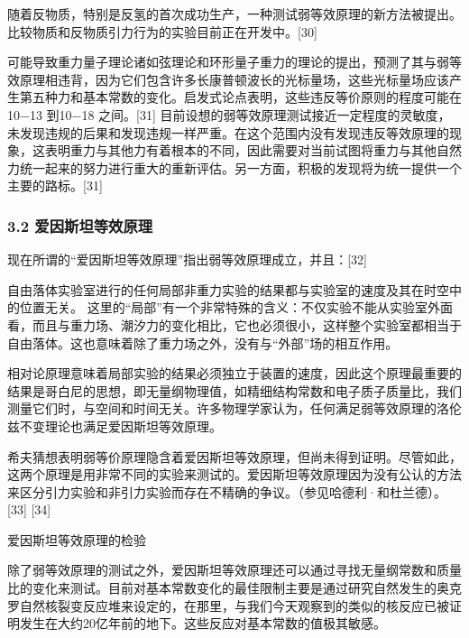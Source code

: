 随着反物质，特别是反氢的首次成功生产，一种测试弱等效原理的新方法被提出。比较物质和反物质引力行为的实验目前正在开发中。[30]

可能导致重力量子理论诸如弦理论和环形量子重力的理论的提出，预测了其与弱等效原理相违背，因为它们包含许多长康普顿波长的光标量场，这些光标量场应该产生第五种力和基本常数的变化。启发式论点表明，这些违反等价原则的程度可能在10−13 到10−18 之间。[31] 目前设想的弱等效原理测试接近一定程度的灵敏度， 未发现违规的后果和发现违规一样严重。在这个范围内没有发现违反等效原理的现象，这表明重力与其他力有着根本的不同，因此需要对当前试图将重力与其他自然力统一起来的努力进行重大的重新评估。另一方面，积极的发现将为统一提供一个主要的路标。[31]

\subsubsection{3.2 爱因斯坦等效原理}

现在所谓的“爱因斯坦等效原理”指出弱等效原理成立，并且：[32]

自由落体实验室进行的任何局部非重力实验的结果都与实验室的速度及其在时空中的位置无关。
这里的“局部”有一个非常特殊的含义：不仅实验不能从实验室外面看，而且与重力场、潮汐力的变化相比，它也必须很小，这样整个实验室都相当于自由落体。这也意味着除了重力场之外，没有与“外部”场的相互作用。

相对论原理意味着局部实验的结果必须独立于装置的速度，因此这个原理最重要的结果是哥白尼的思想，即无量纲物理值，如精细结构常数和电子质子质量比，我们测量它们时，与空间和时间无关。许多物理学家认为，任何满足弱等效原理的洛伦兹不变理论也满足爱因斯坦等效原理。

希夫猜想表明弱等价原理隐含着爱因斯坦等效原理，但尚未得到证明。尽管如此，这两个原理是用非常不同的实验来测试的。爱因斯坦等效原理因为没有公认的方法来区分引力实验和非引力实验而存在不精确的争议。（参见哈德利·和杜兰德）。[33] [34]


\textbf{}{爱因斯坦等效原理的检验}

除了弱等效原理的测试之外，爱因斯坦等效原理还可以通过寻找无量纲常数和质量比的变化来测试。目前对基本常数变化的最佳限制主要是通过研究自然发生的奥克罗自然核裂变反应堆来设定的，在那里，与我们今天观察到的类似的核反应已被证明发生在大约20亿年前的地下。这些反应对基本常数的值极其敏感。

